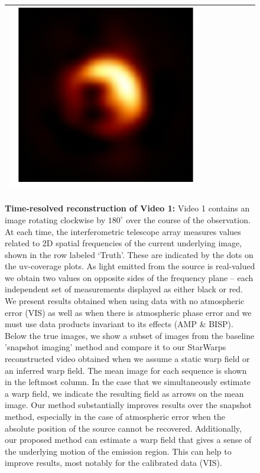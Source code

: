 \begin{figure}
\begin{center}
\begin{tabular}{  c | c | c  c  c  c  c c }
			\includegraphics[height=0.12\linewidth]{figures/starwarps_results/rotation30/amp-bispectrum_sol1/best/frames/mean_noaxis_29.pdf}  
			\\ \hline  	
		\end{tabular}
		\caption{{\bf Time-resolved reconstruction of Video 1:} Video 1 contains an image rotating clockwise by $180^{\circ}$ over the course of the observation. At each time, the interferometric telescope array measures values related to 2D spatial frequencies of the current underlying image, shown in the row labeled `Truth'. These are indicated by the dots on the uv-coverage plots. As light emitted from the source is real-valued we obtain two values on opposite sides of the frequency plane -- each independent set of measurements displayed as either black or red. We present results obtained when using data with no atmospheric error (VIS) as well as when there is atmospheric phase error and we must use data products invariant to its effects (AMP \& BISP).
			Below the true images, we show a subset of images from the baseline 'snapshot imaging' method and compare it to our StarWarps reconstructed video obtained when we assume a static warp field or an inferred warp field. The mean image for each sequence is shown in the leftmost column. In the case that we simultaneously estimate a warp field, we indicate the resulting field as arrows on the mean image. Our method substantially improves results over the snapshot method, especially in the case of atmospheric error when the absolute position of the source cannot be recovered. Additionally, our proposed method can estimate a warp field that gives a sense of the underlying motion of the emission region. This can help to improve results, most notably for the calibrated data (VIS). }
		\label{fig:rotation_example1}
	\end{center}
\end{figure}
